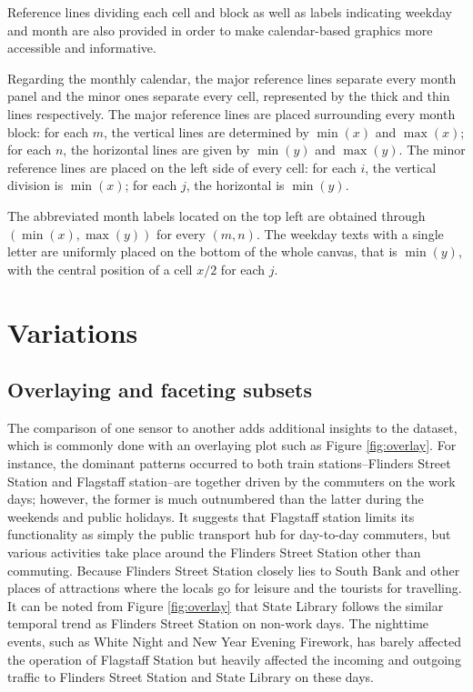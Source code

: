 \documentclass[article]{jss}
\begin{document}
Reference lines dividing each cell and block as well as labels
indicating weekday and month are also provided in order to make
calendar-based graphics more accessible and informative.

Regarding the monthly calendar, the major reference lines separate every
month panel and the minor ones separate every cell, represented by the
thick and thin lines respectively. The major reference lines are placed
surrounding every month block: for each \(m\), the vertical lines are
determined by \(\min{(x)}\) and \(\max{(x)}\); for each \(n\), the
horizontal lines are given by \(\min{(y)}\) and \(\max{(y)}\). The minor
reference lines are placed on the left side of every cell: for each
\(i\), the vertical division is \(\min{(x)}\); for each \(j\), the
horizontal is \(\min{(y)}\).

The abbreviated month labels located on the top left are obtained
through \((\min{(x)}, \max{(y)})\) for every \((m, n)\). The weekday
texts with a single letter are uniformly placed on the bottom of the
whole canvas, that is \(\min{(y)}\), with the central position of a cell
\(x / 2\) for each \(j\).

\section{Variations}\label{variations}

\label{sec:examples}

\subsection{Overlaying and faceting
subsets}\label{overlaying-and-faceting-subsets}

The comparison of one sensor to another adds additional insights to the
dataset, which is commonly done with an overlaying plot such as Figure
\ref{fig:overlay}. For instance, the dominant patterns occurred to both
train stations--Flinders Street Station and Flagstaff station--are
together driven by the commuters on the work days; however, the former
is much outnumbered than the latter during the weekends and public
holidays. It suggests that Flagstaff station limits its functionality as
simply the public transport hub for day-to-day commuters, but various
activities take place around the Flinders Street Station other than
commuting. Because Flinders Street Station closely lies to South Bank
and other places of attractions where the locals go for leisure and the
tourists for travelling. It can be noted from Figure \ref{fig:overlay}
that State Library follows the similar temporal trend as Flinders Street
Station on non-work days. The nighttime events, such as White Night and
New Year Evening Firework, has barely affected the operation of
Flagstaff Station but heavily affected the incoming and outgoing traffic
to Flinders Street Station and State Library on these days.
\end{document}
